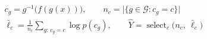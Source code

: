 \documentclass[border=2pt]{standalone}
\DeclareMathOperator{\select}{select}
\begin{document}
$\displaystyle
\begin{gathered}
c_g = g^{-1}\big(f(g(x))\big), \qquad n_c = \big|\{g\in\mathcal{G}: c_g=c\}\big| \\[5pt]
\bar{\ell}_c = \frac{1}{n_c}\sum_{g:\,c_g=c}\log p(c_g), \qquad \hat{Y} = \select_{c}\big(n_c,\ \bar{\ell}_c\big)
\end{gathered}$
\end{document}
